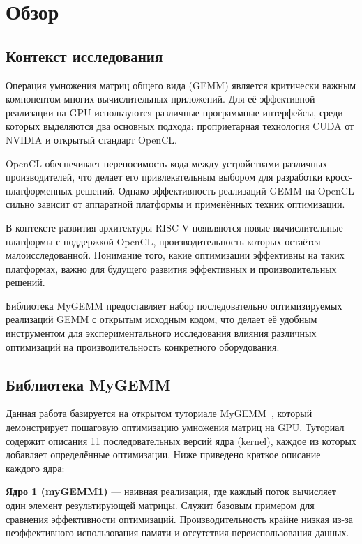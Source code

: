 
\section{Обзор}
\label{sec:relatedworks}

\subsection{Контекст исследования}

Операция умножения матриц общего вида (GEMM) является критически важным компонентом многих вычислительных приложений. Для её эффективной реализации на GPU используются различные программные интерфейсы, среди которых выделяются два основных подхода: проприетарная технология CUDA от NVIDIA и открытый стандарт OpenCL.

OpenCL обеспечивает переносимость кода между устройствами различных производителей, что делает его привлекательным выбором для разработки кросс-платформенных решений. Однако эффективность реализаций GEMM на OpenCL сильно зависит от аппаратной платформы и применённых техник оптимизации.

В контексте развития архитектуры RISC-V появляются новые вычислительные платформы с поддержкой OpenCL, производительность которых остаётся малоисследованной. Понимание того, какие оптимизации эффективны на таких платформах, важно для будущего развития эффективных и производительных решений.

Библиотека MyGEMM предоставляет набор последовательно оптимизируемых реализаций GEMM с открытым исходным кодом, что делает её удобным инструментом для экспериментального исследования влияния различных оптимизаций на производительность конкретного оборудования.

\subsection{Библиотека MyGEMM}

Данная работа базируется на открытом туториале MyGEMM~\cite{nugteren2018mygemm}, который демонстрирует пошаговую оптимизацию умножения матриц на GPU. Туториал содержит описания 11 последовательных версий ядра (kernel), каждое из которых добавляет определённые оптимизации. Ниже приведено краткое описание каждого ядра:

\textbf{Ядро 1 (myGEMM1)} --- наивная реализация, где каждый поток вычисляет один элемент результирующей матрицы. Служит базовым примером для сравнения эффективности оптимизаций. Производительность крайне низкая из-за неэффективного использования памяти и отсутствия переиспользования данных.

